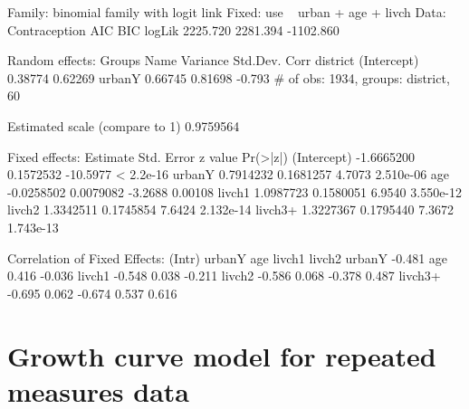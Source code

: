 \documentclass[12pt]{article}
\begin{document}
\begin{Schunk}
\begin{Soutput}
Family: binomial family with logit link
Fixed: use ~ urban + age + livch 
Data: Contraception 
      AIC      BIC    logLik
 2225.720 2281.394 -1102.860

Random effects:
 Groups   Name        Variance Std.Dev. Corr   
 district (Intercept) 0.38774  0.62269         
          urbanY      0.66745  0.81698  -0.793 
# of obs: 1934, groups: district, 60

Estimated scale (compare to 1)  0.9759564 

Fixed effects:
              Estimate Std. Error  z value  Pr(>|z|)
(Intercept) -1.6665200  0.1572532 -10.5977 < 2.2e-16
urbanY       0.7914232  0.1681257   4.7073 2.510e-06
age         -0.0258502  0.0079082  -3.2688   0.00108
livch1       1.0987723  0.1580051   6.9540 3.550e-12
livch2       1.3342511  0.1745854   7.6424 2.132e-14
livch3+      1.3227367  0.1795440   7.3672 1.743e-13

Correlation of Fixed Effects:
        (Intr) urbanY age    livch1 livch2
urbanY  -0.481                            
age      0.416 -0.036                     
livch1  -0.548  0.038 -0.211              
livch2  -0.586  0.068 -0.378  0.487       
livch3+ -0.695  0.062 -0.674  0.537  0.616
\end{Soutput}
\end{Schunk}


\section{Growth curve model for repeated measures data}
\label{sec:GrowthCurve}
\end{document}
